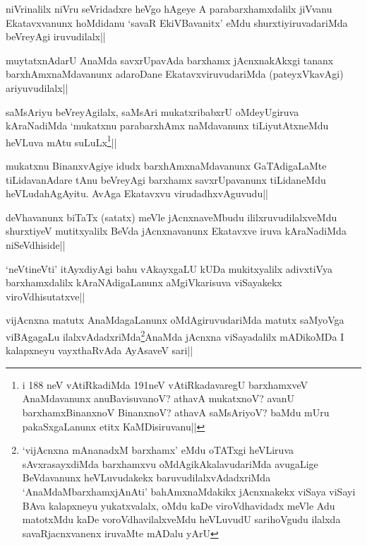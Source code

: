 
\begin{artha}
niVrinalilx niVru seVridadxre heVgo hAgeye A parabarxhamxdalilx jiVvanu Ekatavxvanunx hoMdidanu `savaR EkiVBavanitx' eMdu shurxtiyiruvadariMda beVreyAgi iruvudilalx||
\end{artha}


\begin{artha}
muytatxnAdarU AnaMda savxrUpavAda barxhamx jAcnxnakAkxgi tananx barxhAmxnaMdavanunx adaroDane EkatavxviruvudariMda (pateyxVkavAgi) ariyuvudilalx||

saMsAriyu beVreyAgilalx, saMsAri mukatxribabxrU oMdeyUgiruva kAraNadiMda `mukatxnu parabarxhAmx naMdavanunx tiLiyutAtxneMdu heVLuva mAtu suLuLx\footnote[1]{i 188 neV vAtiRkadiMda 191neV vAtiRkadavaregU barxhamxveV AnaMdavanunx anuBavisuvanoV? athavA mukatxnoV? avanU barxhamxBinanxnoV BinanxnoV? athavA saMsAriyoV? baMdu mUru pakaSxgaLanunx etitx KaMDisiruvanu||}||
\end{artha}

\begin{artha}%
mukatxnu BinanxvAgiye idudx barxhAmxnaMdavanunx GaTAdigaLaMte tiLidavanAdare tAnu beVreyAgi barxhamx savxrUpavanunx tiLidaneMdu heVLudahAgAyitu. AvAga Ekatavxvu virudadhxvAguvudu||
\end{artha}

\begin{artha}
deVhavanunx biTaTx (satatx) meVle jAcnxnaveMbudu  ililxruvudilalxveMdu shurxtiyeV mutitxyalilx BeVda jAcnxnavanunx Ekatavxve iruva kAraNadiMda niSeVdhiside||
\end{artha}

\begin{artha}
`neVtineVti' itAyxdiyAgi bahu vAkayxgaLU kUDa mukitxyalilx adivxtiVya barxhamxdalilx kAraNAdigaLanunx aMgiVkarisuva viSayakekx viroVdhisutatxve||
\end{artha}

\begin{artha}
vijAcnxna matutx AnaMdagaLanunx oMdAgiruvudariMda matutx saMyoVga viBAgagaLu ilalxvAdadxriMda\footnote[1]{`vijAcnxna mAnanadxM barxhamx' eMdu oTATxgi heVLiruva sAvxrasayxdiMda barxhamxvu oMdAgikAkalavudariMda avugaLige BeVdavanunx heVLuvudakekx baruvudilalxvAdadxriMda `AnaMdaMbarxhamxjAnAti' bahAmxnaMdakikx jAcnxnakekx viSaya viSayi BAva kalapxneyu yukatxvalalx, oMdu kaDe viroVdhavidadx meVle Adu matotxMdu kaDe voroVdhavilalxveMdu heVLuvudU sarihoVgudu ilalxda savaRjacnxvanenx iruvaMte mADalu yArU}AnaMda jAcnxna viSayadalilx mADikoMDa I kalapxneyu vayxthaRvAda AyAsaveV sari||
\end{artha}

